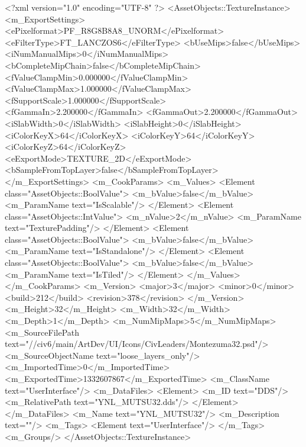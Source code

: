 <?xml version="1.0" encoding="UTF-8" ?>
<AssetObjects::TextureInstance>
	<m_ExportSettings>
		<ePixelformat>PF_R8G8B8A8_UNORM</ePixelformat>
		<eFilterType>FT_LANCZOS6</eFilterType>
		<bUseMips>false</bUseMips>
		<iNumManualMips>0</iNumManualMips>
		<bCompleteMipChain>false</bCompleteMipChain>
		<fValueClampMin>0.000000</fValueClampMin>
		<fValueClampMax>1.000000</fValueClampMax>
		<fSupportScale>1.000000</fSupportScale>
		<fGammaIn>2.200000</fGammaIn>
		<fGammaOut>2.200000</fGammaOut>
		<iSlabWidth>0</iSlabWidth>
		<iSlabHeight>0</iSlabHeight>
		<iColorKeyX>64</iColorKeyX>
		<iColorKeyY>64</iColorKeyY>
		<iColorKeyZ>64</iColorKeyZ>
		<eExportMode>TEXTURE_2D</eExportMode>
		<bSampleFromTopLayer>false</bSampleFromTopLayer>
	</m_ExportSettings>
	<m_CookParams>
		<m_Values>
			<Element class="AssetObjects::BoolValue">
				<m_bValue>false</m_bValue>
				<m_ParamName text="IsScalable"/>
			</Element>
			<Element class="AssetObjects::IntValue">
				<m_nValue>2</m_nValue>
				<m_ParamName text="TexturePadding"/>
			</Element>
			<Element class="AssetObjects::BoolValue">
				<m_bValue>false</m_bValue>
				<m_ParamName text="IsStandalone"/>
			</Element>
			<Element class="AssetObjects::BoolValue">
				<m_bValue>false</m_bValue>
				<m_ParamName text="IsTiled"/>
			</Element>
		</m_Values>
	</m_CookParams>
	<m_Version>
		<major>3</major>
		<minor>0</minor>
		<build>212</build>
		<revision>378</revision>
	</m_Version>
	<m_Height>32</m_Height>
	<m_Width>32</m_Width>
	<m_Depth>1</m_Depth>
	<m_NumMipMaps>5</m_NumMipMaps>
	<m_SourceFilePath text="//civ6/main/ArtDev/UI/Icons/CivLeaders/Montezuma32.psd"/>
	<m_SourceObjectName text="loose_layers_only"/>
	<m_ImportedTime>0</m_ImportedTime>
	<m_ExportedTime>1332607867</m_ExportedTime>
	<m_ClassName text="UserInterface"/>
	<m_DataFiles>
		<Element>
			<m_ID text="DDS"/>
			<m_RelativePath text="YNL_MUTSU32.dds"/>
		</Element>
	</m_DataFiles>
	<m_Name text="YNL_MUTSU32"/>
	<m_Description text=""/>
	<m_Tags>
		<Element text="UserInterface"/>
	</m_Tags>
	<m_Groups/>
</AssetObjects::TextureInstance>

 